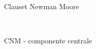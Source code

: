 \documentclass[12pt,a4paper,twoside]{report}
\begin{document}
\begin{figure}[ht]
\begin{subfigure}[b]{0.5\textwidth}
                \caption{Clauset Newman Moore}
            \end{subfigure}%
            ~
            \begin{subfigure}[b]{0.5\textwidth}
                \centering
                \setlength{\fboxrule}{0pt} %
                \caption{CNM - componente centrale}
            \end{subfigure}%
            \\
            \begin{subfigure}[b]{0.5\textwidth}
                \centering
                \setlength{\fboxrule}{0pt} %

\end{subfigure}
\end{figure}
\end{document}
